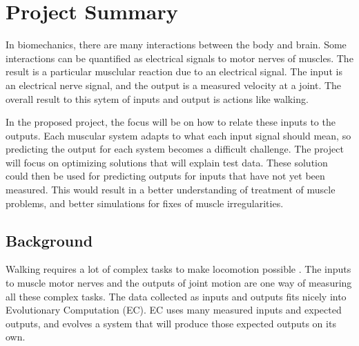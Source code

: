 

 


\section{Project Summary}
In biomechanics, there are many interactions between the body and brain. Some
interactions can be quantified as electrical signals to motor nerves of muscles.
The result is a particular musclular reaction due to an electrical signal. The
input is an electrical nerve signal, and the output is a measured velocity at
a joint. The overall result to this sytem of inputs and output is actions like 
walking.

In the proposed project, the focus will be on how to relate these inputs to the 
outputs. Each muscular system adapts to what each input signal should mean, so
predicting the output for each system becomes a difficult challenge. The 
project will focus on optimizing solutions that will explain test data. These
solution could then be used for predicting outputs for inputs that have not
yet been measured. This would result in a better understanding of treatment 
of muscle problems, and better simulations for fixes of muscle irregularities.

\subsection{Background}
Walking requires a lot of complex tasks to make locomotion possible 
\cite{mcgowan}. The inputs to muscle motor nerves and the outputs of joint
motion are one way of measuring all these complex tasks. The data collected
as inputs and outputs fits nicely into Evolutionary Computation (EC). EC uses 
many measured inputs and expected outputs, and evolves a system that will 
produce those expected outputs on its own. 


